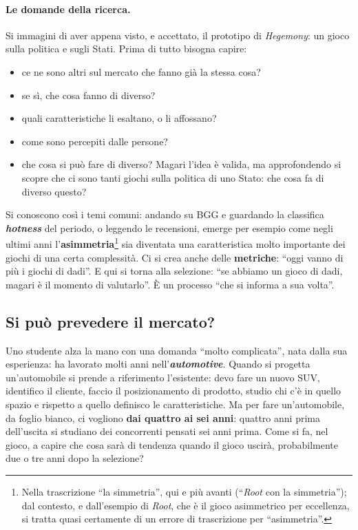 \paragraph{Le domande della ricerca.} Si immagini di aver appena visto, e accettato, il
prototipo di \emph{Hegemony}: un gioco sulla politica e sugli Stati. Prima di tutto
bisogna capire:
\begin{itemize}
  \item ce ne sono altri sul mercato che fanno già la stessa cosa?
  \item se sì, che cosa fanno di diverso?
  \item quali caratteristiche li esaltano, o li affossano?
  \item come sono percepiti dalle persone?
  \item che cosa si può fare di diverso? Magari l'idea è valida, ma approfondendo si scopre
        che ci sono tanti giochi sulla politica di uno Stato: che cosa fa di diverso
        questo?
\end{itemize}
Si conoscono così i temi comuni: andando su BGG e guardando la classifica
\textbf{\emph{hotness}} del periodo, o leggendo le recensioni, emerge per esempio come
negli ultimi anni l'\textbf{asimmetria}\footnote{Nella trascrizione ``la simmetria'', qui e
più avanti (``\emph{Root} con la simmetria''); dal contesto, e dall'esempio di
\emph{Root}, che è il gioco asimmetrico per eccellenza, si tratta quasi certamente di un
errore di trascrizione per ``asimmetria''.} sia diventata una caratteristica molto
importante dei giochi di una certa complessità. Ci si crea anche delle
\textbf{metriche}: ``oggi vanno di più i giochi di dadi''. E qui si torna alla selezione:
``se abbiamo un gioco di dadi, magari è il momento di valutarlo''. È un processo ``che si
informa a sua volta''.

\subsection{Si può prevedere il mercato?}
\label{a13:sec:prevedere}

Uno studente alza la mano con una domanda ``molto complicata'', nata dalla sua esperienza:
ha lavorato molti anni nell'\textbf{\emph{automotive}}. Quando si progetta un'automobile si
prende a riferimento l'esistente: devo fare un nuovo SUV, identifico il cliente, faccio il
posizionamento di prodotto, studio chi c'è in quello spazio e rispetto a quello definisco
le caratteristiche. Ma per fare un'automobile, da foglio bianco, ci vogliono \textbf{dai
quattro ai sei anni}: quattro anni prima dell'uscita si studiano dei concorrenti pensati
sei anni prima. Come si fa, nel gioco, a capire che cosa sarà di tendenza quando il gioco
uscirà, probabilmente due o tre anni dopo la selezione?

